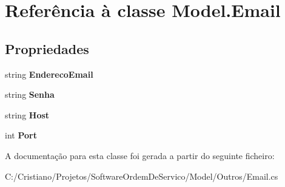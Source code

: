 \hypertarget{class_model_1_1_email}{}\section{Referência à classe Model.\+Email}
\label{class_model_1_1_email}
\subsection*{Propriedades}
\begin{DoxyCompactItemize}
\item 
\hypertarget{class_model_1_1_email_a4fd6cccd2a900446888afd04bbe5d9c1}{}string {\bfseries Endereco\+Email}\label{class_model_1_1_email_a4fd6cccd2a900446888afd04bbe5d9c1}

\item 
\hypertarget{class_model_1_1_email_ae9fee29ee93a0dcff23fd6f15155e8af}{}string {\bfseries Senha}\label{class_model_1_1_email_ae9fee29ee93a0dcff23fd6f15155e8af}

\item 
\hypertarget{class_model_1_1_email_a83c0e904c2a20128fd9c9de2c73d9145}{}string {\bfseries Host}\label{class_model_1_1_email_a83c0e904c2a20128fd9c9de2c73d9145}

\item 
\hypertarget{class_model_1_1_email_a3ecbfd4da2114343a50ae2ce2962b3db}{}int {\bfseries Port}\label{class_model_1_1_email_a3ecbfd4da2114343a50ae2ce2962b3db}

\end{DoxyCompactItemize}


A documentação para esta classe foi gerada a partir do seguinte ficheiro\+:\begin{DoxyCompactItemize}
\item 
C\+:/\+Cristiano/\+Projetos/\+Software\+Ordem\+De\+Servico/\+Model/\+Outros/Email.\+cs\end{DoxyCompactItemize}
